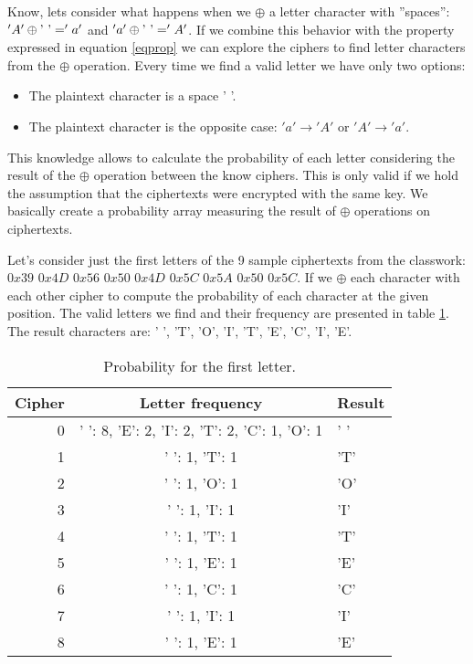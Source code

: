 \documentclass{article}
\newcommand*\xor{\mathbin{\oplus}}
\begin{document}
Know, lets consider what happens when we $\xor$ a letter character with ''spaces'': $'A'\xor\textnormal{'   '}='a'$ and $'a'\xor\textnormal{'   '}='A'$. If we combine this behavior with the property expressed in equation \ref{eqprop} we can explore the ciphers to find letter characters from the $\xor$ operation. Every time we find a valid letter we have only two options:
\begin{itemize}
\item The plaintext character is a space ' '.
\item The plaintext character is the opposite case: $'a' \rightarrow 'A'$ or $'A'\rightarrow 'a'$.
\end{itemize}

This knowledge allows to calculate the probability of each letter considering the result of the $\xor$ operation between the know ciphers. This is only valid if we hold the assumption that the ciphertexts were encrypted with the same key. We basically create a probability array measuring the result of $\xor$ operations on ciphertexts.

Let's consider just the first letters of the 9 sample ciphertexts from the classwork: $0x39$ $0x4D$ $0x56$ $0x50$ $0x4D$ $0x5C$ $0x5A$ $0x50$ $0x5C$. If we $\xor$ each character with each other cipher to compute the probability of each character at the given position. The valid letters we find and their frequency are presented in table \ref{probt}. The result characters are: ' ', 'T', 'O', 'I', 'T', 'E', 'C', 'I', 'E'.

\begin{table}[!htp]
 \centering
 \label{probt}
  \begin{tabular}{r c l}
  \\ \hline
  Cipher  & Letter frequency & Result \\ \hline
   0 & {' ': 8, 'E': 2, 'I': 2, 'T': 2, 'C': 1, 'O': 1} & ' ' \\ \hline
   1 & {' ': 1, 'T': 1} & 'T' \\ \hline
   2 & {' ': 1, 'O': 1} & 'O' \\ \hline
   3 & {' ': 1, 'I': 1} & 'I' \\ \hline
   4 & {' ': 1, 'T': 1} & 'T' \\ \hline
   5 & {' ': 1, 'E': 1} & 'E' \\ \hline
   6 & {' ': 1, 'C': 1} & 'C' \\ \hline
   7 & {' ': 1, 'I': 1} & 'I' \\ \hline
   8 & {' ': 1, 'E': 1} & 'E' \\ \hline
   \end{tabular}
 \caption{Probability for the first letter.}
\end{table}
\end{document}
